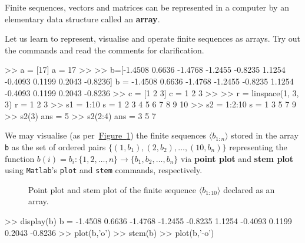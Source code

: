 Finite sequences, vectors and matrices can be represented in a computer by an elementary data structure called an {\bf array}.

\begin{labwork}\label{LW:Seqs}
Let us learn to represent, visualise and operate finite sequences as \Matlab arrays.  Try out the commands and read the comments for clarification.
\begin{VrbM}
>> a = [17]			%
a =    17
>> %
>> b=[-1.4508 0.6636 -1.4768 -1.2455 -0.8235 1.1254 -0.4093 0.1199 0.2043 -0.8236]
b =
   -1.4508    0.6636   -1.4768   -1.2455   -0.8235    1.1254   -0.4093    0.1199    0.2043   -0.8236
>> c = [1 2 3] 		%
c =     1     2     3
>> %
>> r = linspace(1, 3, 3)		%
r =     1     2     3
>> s1 = 1:10 %
s =     1     2     3     4     5     6     7     8     9    10
>> s2 = 1:2:10  %
s =     1     3     5     7     9
>> s2(3) %
ans =     5
>> s2(2:4) %
ans =     3     5     7
\end{VrbM}
We may visualise (as per~\hyperref[F:StemPlotDemo1]{Figure~\ref*{F:StemPlotDemo1}}) the finite sequences $\langle b_{1:n} \rangle$ stored in the array {\tt b} as the set of ordered pairs $\{(1,b_1),(2,b_2),\ldots,(10,b_{n})\}$ representing the function $b(i)=b_i:\{1,2,\ldots,n\} \to \{b_1,b_2,\ldots,b_{n} \}$ via {\bf point plot} and {\bf stem plot}  using {\tt Matlab}'s {\tt plot} and {\tt stem} commands, respectively.

\begin{figure}[hbt]
\caption{Point plot and stem plot of the finite sequence $\langle b_{1:10} \rangle$ declared as an array.\label{F:StemPlotDemo1}}
\centering   {}
\end{figure}
\begin{VrbM}
>> display(b) %
b =
   -1.4508    0.6636   -1.4768   -1.2455   -0.8235    1.1254   -0.4093    0.1199    0.2043   -0.8236
>> plot(b,'o') %
>> stem(b) %
>> plot(b,'-o') %
\end{VrbM}
\end{labwork}

